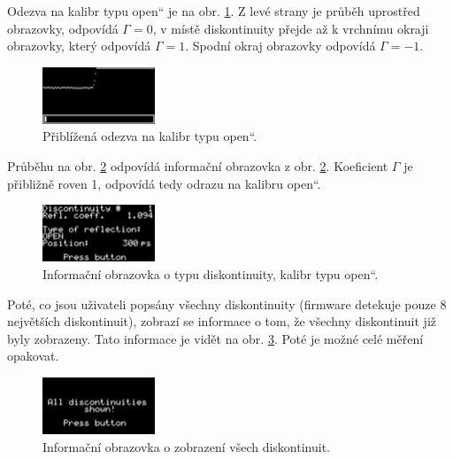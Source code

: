 Odezva na kalibr typu \quotedblbase open\textquotedblleft{} je na obr. \ref{discontinuity_open}. Z levé strany je průběh uprostřed obrazovky, odpovídá $\Gamma=0$, v místě diskontinuity přejde až k vrchnímu okraji obrazovky, který odpovídá $\Gamma=1$. Spodní okraj obrazovky odpovídá $\Gamma=-1$.
\begin{figure}[H]
\includegraphics[width=0.3\textwidth,keepaspectratio,interpolate=false]{images/discontinuity_open.png}\caption{Přiblížená odezva na kalibr typu \quotedblbase open\textquotedblleft .}\label{discontinuity_open}
\end{figure}

Průběhu na obr. \ref{discontinuity_open_report} odpovídá informační obrazovka z obr. \ref{discontinuity_open_report}. Koeficient $\Gamma$ je přibližně roven 1, odpovídá tedy odrazu na kalibru \quotedblbase open\textquotedblleft .
\begin{figure}[H]
\includegraphics[width=0.3\textwidth,keepaspectratio,interpolate=false]{images/discontinuity_open_report.png}\caption{Informační obrazovka o typu diskontinuity, kalibr typu \quotedblbase open\textquotedblleft .}\label{discontinuity_open_report}
\end{figure}

Poté, co jsou uživateli popsány všechny diskontinuity (firmware detekuje pouze 8 největších diskontinuit), zobrazí se informace o tom, že všechny diskontinuit již byly zobrazeny. Tato informace je vidět na obr. \ref{discontinuities_shown}. Poté je možné celé měření opakovat.
\begin{figure}[H]
\includegraphics[width=0.3\textwidth,keepaspectratio,interpolate=false]{images/discontinuities_shown.png}\caption{Informační obrazovka o zobrazení všech diskontinuit.}\label{discontinuities_shown}
\end{figure}
